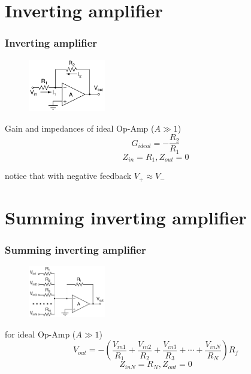 \documentclass[beamer]{standalone}
\begin{document}
\section{Inverting amplifier}
\begin{frame}
\frametitle{Inverting amplifier}
\begin{figure}
	\includegraphics[width=0.30\textwidth]{./schematics/inv_ampl.pdf}
\end{figure}

\begin{block}{Gain  and impedances of ideal Op-Amp ($A \gg 1$)}
\begin{equation*}
	G_{ideal}=-\frac{R_2}{R_1}
\end{equation*}
\begin{equation*}
	Z_{in}=R_1, Z_{out}=0
\end{equation*}
\end{block}
\alert{notice that with negative feedback $V_{+} \approx V_-$}
\end{frame}
	
\section{Summing inverting amplifier}
\begin{frame}
\frametitle{Summing inverting amplifier}
\begin{figure}
	\includegraphics[width=0.30\textwidth]{./schematics/summing_inv_ampl.pdf}
\end{figure}

\begin{block}{for ideal Op-Amp ($A \gg 1$)}
\begin{equation*}
	V_{out}= -\left( 
	\frac{V_{in1}}{R_1} 
	+  \frac{V_{in2}}{R_2}
	+\frac{V_{in3}}{R_3} 
	+ \cdots 
	+ \frac{V_{inN}}{R_N} \right) R_f
\end{equation*}
\begin{equation*}
	Z_{inN}=R_N, Z_{out}=0
\end{equation*}
\end{block}
\end{frame}
	
\end{document}
